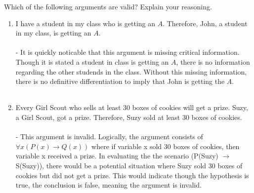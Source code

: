 \documentclass{amsart}
\theoremstyle{definition}
\theoremstyle{Exercise}
\theoremstyle{remark}
\theoremstyle{rule}
\numberwithin{equation}{section}
\begin{document}
 Which of the following arguments are valid? Explain your reasoning.\\
 \begin{enumerate}[label=(\alph*)]
\item I have a student in my class who is getting an $A$. Therefore, John, a student in my class, is getting an $A$. \\\\
- It is quickly noticable that this argument is missing critical information. Though it is stated a student in class is getting an $A$, there is no information regarding the other 
studends in the class. Without this missing information, there is no definitive differentiation to imply that John is getting the $A$.
\\\\
\item Every Girl Scout who sells at least 30 boxes of cookies will get a prize. Suzy, a Girl Scout, got a prize. Therefore, Suzy sold at least 30 boxes of cookies.\\\\
- This argument is invalid. Logically, the argument consists of $ \forall x (P(x) \rightarrow Q(x))$ where if variable x sold 30 boxes of cookies, then variable x received a prize.
In evaluating the the scenario (P(Suzy) $\to$ S(Suzy)), there would be a potential situation where Suzy sold 30 boxes of cookies but did not get a prize. This would indicate though the
hypothesis is true, the conclusion is false, meaning the argument is invalid.
\\\\
 \end{enumerate}
\end{document}
